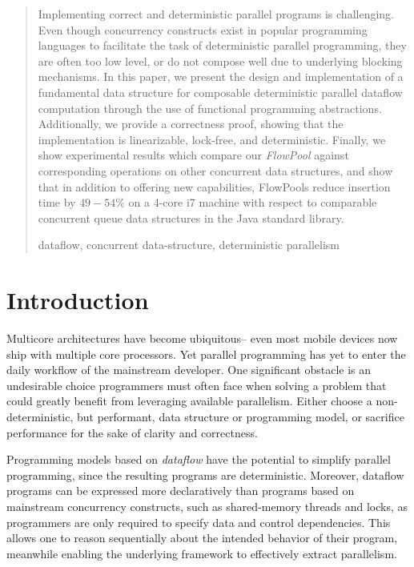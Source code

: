 \documentclass[runningheads,a4paper]{llncs}
\newcommand{\keywords}[1]{\par\addvspace\baselineskip
\noindent\keywordname\enspace\ignorespaces#1}
\begin{document}
\begin{abstract}
Implementing correct and deterministic parallel programs is challenging. Even
though concurrency constructs exist in popular programming languages to
facilitate the task of deterministic parallel programming, they are often too
low level, or do not compose well due to underlying blocking mechanisms. In
this paper, we present the design and implementation of a fundamental data
structure for composable deterministic parallel dataflow computation through
the use of functional programming abstractions. Additionally, we provide a
correctness proof, showing that the implementation is linearizable,
lock-free, and deterministic. Finally, we show experimental results which
compare our \emph{FlowPool} against corresponding operations on other 
concurrent data structures, and show that in addition to offering new
capabilities, FlowPools reduce insertion time by $49 - 54\%$ on a
4-core i7 machine with respect to comparable concurrent queue data
structures in the Java standard library.
\keywords{dataflow, concurrent data-structure, deterministic parallelism}
\end{abstract}


\section{Introduction}

Multicore architectures have become ubiquitous-- even most mobile devices now
ship with multiple core processors. Yet parallel programming has yet to enter
the daily workflow of the mainstream developer. One significant obstacle is an
undesirable choice programmers must often face when solving a problem that
could greatly benefit from leveraging available parallelism. Either choose a
non-deterministic, but performant, data structure or programming model, or
sacrifice performance for the sake of clarity and correctness.

Programming models based on \emph{dataflow} \cite{Arvind89,CnC10} have the
potential to simplify parallel programming, since the resulting programs are
deterministic. Moreover, dataflow programs can be expressed more declaratively
than programs based on mainstream concurrency constructs, such as shared-memory 
threads and locks, as programmers are only required to specify data and
control dependencies. This allows one to reason sequentially about the
intended behavior of their program, meanwhile enabling the underlying
framework to effectively extract parallelism.
\end{document}
